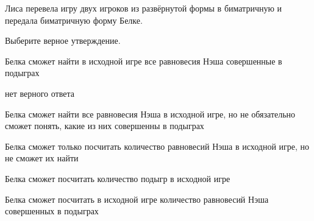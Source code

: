 
\begin{question}
Лиса перевела игру двух игроков из развёрнутой формы в биматричную и передала биматричную форму Белке.

Выберите верное утверждение.
\begin{answerlist}
  \item Белка сможет найти в исходной игре все равновесия Нэша совершенные в подыграх
  \item нет верного ответа
  \item Белка сможет найти все равновесия Нэша в исходной игре, но не обязательно сможет понять, какие из них совершенны в подыграх
  \item Белка сможет только посчитать количество равновесий Нэша в исходной игре, но не сможет их найти
  \item Белка сможет посчитать количество подыгр в исходной игре
  \item Белка сможет посчитать в исходной игре количество равновесий Нэша совершенных в подыграх
\end{answerlist}
\end{question}



